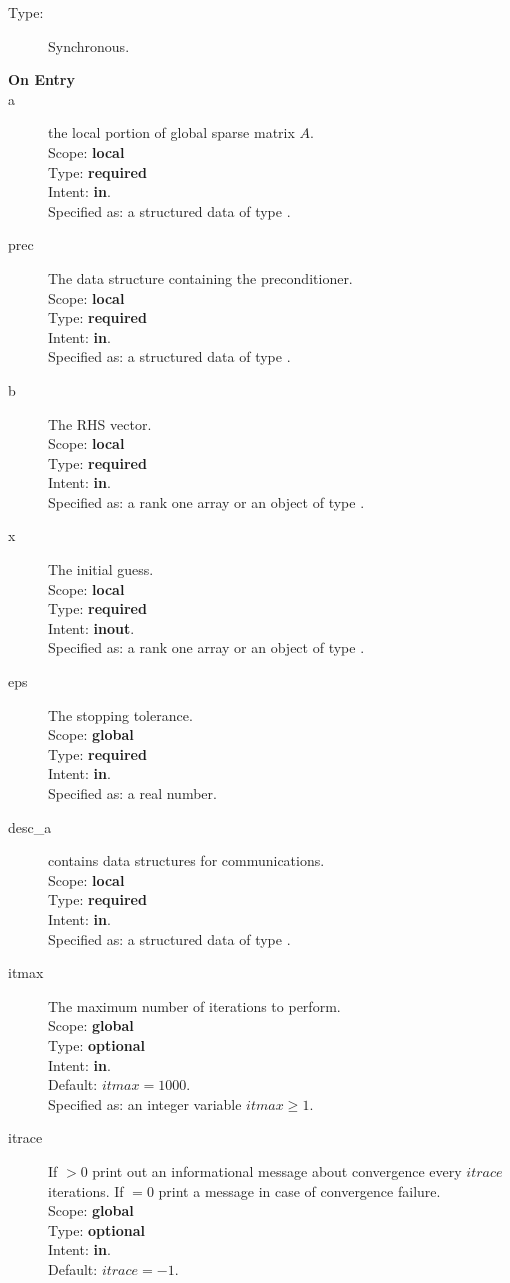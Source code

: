 \begin{description}
\item[Type:] Synchronous.
\item[\bf On Entry]
\item[a] the local portion of global sparse matrix
$A$. \\
Scope: {\bf local} \\
Type: {\bf required}\\
Intent: {\bf in}.\\
Specified as: a structured data of type \spdata.
\item[prec] The data structure containing the preconditioner.\\
Scope: {\bf local} \\
Type: {\bf required}\\
Intent: {\bf in}.\\
Specified as: a structured data of type \precdata.
\item[b] The RHS vector. \\
Scope: {\bf local} \\
Type: {\bf required}\\
Intent: {\bf in}.\\
Specified as:  a rank one array or an object of type \vdata.
\item[x] The initial guess. \\
Scope: {\bf local} \\
Type: {\bf required}\\
Intent: {\bf inout}.\\
Specified as:  a rank one array or an object of type \vdata.
\item[eps] The stopping tolerance. \\
Scope: {\bf global} \\
Type: {\bf required}\\
Intent: {\bf in}.\\
Specified as: a real number. 
\item[desc\_a] contains data structures for communications.\\
Scope: {\bf local} \\
Type: {\bf required}\\
Intent: {\bf in}.\\
Specified as: a structured data of type \descdata.
\item[itmax]  The maximum number of iterations to perform.\\
Scope: {\bf global} \\
Type: {\bf optional}\\
Intent: {\bf in}.\\
Default: $itmax = 1000$.\\
Specified as: an integer variable $itmax \ge 1$.
\item[itrace] If $>0$  print out an informational message about
  convergence  every $itrace$ iterations. If $=0$ print a message in
  case of convergence failure.\\ 
Scope: {\bf global} \\
Type: {\bf optional}\\
Intent: {\bf in}.\\
Default: $itrace = -1$.\\


\end{description}
